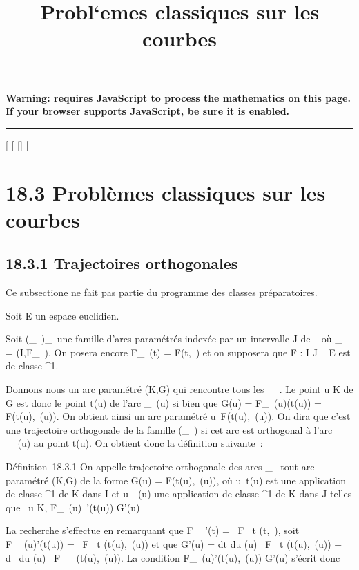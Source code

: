 \documentclass[]{article}
\title{Probl`emes classiques sur les courbes}
\author{}
\date{}
\begin{document}
\maketitle

\textbf{Warning: 
requires JavaScript to process the mathematics on this page.\\ If your
browser supports JavaScript, be sure it is enabled.}

\begin{center}\rule{3in}{0.4pt}\end{center}

[
[
[]
[

\section{18.3 Problèmes classiques sur les courbes}

\subsection{18.3.1 Trajectoires orthogonales}

Ce subsectione ne fait pas partie du programme des classes préparatoires.

Soit E un espace euclidien.

Soit (\Gamma_\lambda~)_\lambda~\inJ une famille d'arcs paramétrés indexée
par un intervalle J de ~ où \Gamma_\lambda~ = (I,F_\lambda~). On posera
encore F_\lambda~(t) = F(t,\lambda~) et on supposera que F : I \times J \rightarrow~ E est de
classe ^1.

Donnons nous un arc paramétré (K,G) qui rencontre tous les \Gamma_\lambda~.
Le point u \in K de G est donc le point t(u) de l'arc \Gamma_\lambda~(u) si
bien que G(u) = F_\lambda~(u)(t(u)) = F(t(u),\lambda~(u)). On obtient ainsi
un arc paramétré u\mapsto~F(t(u),\lambda~(u)). On dira que
c'est une trajectoire orthogonale de la famille (\Gamma_\lambda~) si cet
arc est orthogonal à l'arc \Gamma_\lambda~(u) au point t(u). On obtient
donc la définition suivante~:

Définition~18.3.1 On appelle trajectoire orthogonale des arcs
\Gamma_\lambda~ tout arc paramétré (K,G) de la forme G(u) = F(t(u),\lambda~(u)),
où u\mapsto~t(u) est une application de classe
^1 de K dans I et u\mapsto~\lambda~(u) une
application de classe ^1 de K dans J telles que
\forall~u \in K, F_\lambda~(u)~'(t(u)) \bot G'(u)

La recherche s'effectue en remarquant que F_\lambda~'(t) = \partial~F
\over \partial~t (t,\lambda~), soit F_\lambda~(u)'(t(u)) = \partial~F
\over \partial~t (t(u),\lambda~(u)) et que G'(u) = dt
\over du (u) \partial~F \over \partial~t (t(u),\lambda~(u))
+ d\lambda~ \over du (u) \partial~F \over \partial~\lambda~
(t(u),\lambda~(u)). La condition F_\lambda~(u)'(t(u),\lambda~(u)) \bot G'(u) s'écrit
donc
\end{document}
